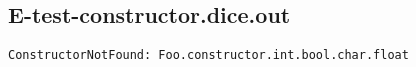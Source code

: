 \subsection{E-test-constructor.dice.out}
\begin{verbatim}
ConstructorNotFound: Foo.constructor.int.bool.char.float

\end{verbatim}